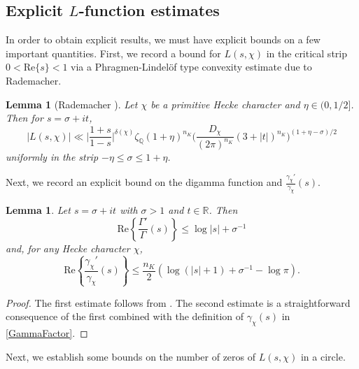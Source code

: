 \documentclass[12pt,psamsfonts]{amsart}
\newtheorem{lem}[thm]{Lemma}
\theoremstyle{definition}
\theoremstyle{remark}
\numberwithin{equation}{section}
\theoremstyle{plain}
\theoremstyle{remark}
\renewcommand{\1}{ {\bf 1}}
\newcommand{\Q}{\mathbb{Q}}
\newcommand{\R}{\mathbb{R}}
\renewcommand{\Re}{\mathrm{Re}}
\begin{document}
\subsection{Explicit $L$-function estimates}

In order to obtain explicit results, we must have explicit bounds on a few important quantities.  First, we record a bound for $L(s,\chi)$ in the critical strip $0 < \Re\{s\} < 1$ via a Phragmen-Lindel\"{o}f type convexity estimate due to Rademacher. 

\begin{lem}[Rademacher \cite{Rademacher}]
\label{Rademacher}
Let $\chi$ be a primitive Hecke character and $\eta \in (0, 1/2]$. Then for $s = \sigma+it$,
\[
|L(s,\chi)| \ll \Big| \frac{1+s}{1-s}\Big|^{\delta(\chi)} \zeta_{\Q}(1+\eta)^{n_K} \Big(  \frac{ D_{\chi} }{ (2\pi)^{n_K}} (3+|t|)^{n_K} \Big)^{ (1+\eta-\sigma)/2} 
\]
uniformly in the strip $-\eta \leq \sigma \leq 1+\eta$. 
\end{lem}

Next, we record an explicit bound on the digamma function and $\frac{\gamma_{\chi}'}{\gamma_\chi}(s)$. 
\begin{lem}
\label{digamma}
Let $s = \sigma+it$ with $\sigma > 1$ and $t \in \R$. Then
\[
\Re\left\{ \frac{\Gamma'}{\Gamma}(s)\right\}\leq \log|s| + \sigma^{-1}
\]
and, for any Hecke character $\chi$, 
\[
\Re\left\{\frac{\gamma_{\chi}'}{\gamma_{\chi}}(s)\right\}\leq \frac{n_K}{2}\left(\log(|s|+1) + \sigma^{-1} -\log \pi\right).
\]
\end{lem}
\begin{proof} The first estimate follows from \cite[Lemma 4]{OS}. The second estimate is a straightforward consequence of the first combined with the definition of $\gamma_{\chi}(s)$ in \eqref{GammaFactor}. 
\end{proof}

Next, we establish some bounds on the number of zeros of $L(s,\chi)$ in a circle. 
\end{document}
